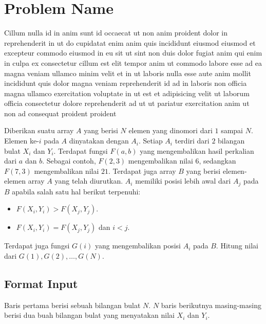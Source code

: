 \section*{
    \centering
    Problem Name
}

\par Cillum nulla id in anim sunt id occaecat ut non anim proident dolor in reprehenderit in ut do cupidatat enim anim quis incididunt eiusmod eiusmod et excepteur commodo eiusmod in eu sit ut sint non duis dolor fugiat anim qui enim in culpa ex consectetur cillum est elit tempor anim ut commodo labore esse ad ea magna veniam ullamco minim velit et in ut laboris nulla esse aute anim mollit incididunt quis dolor magna veniam reprehenderit id ad in laboris non officia magna ullamco exercitation voluptate in ut est et adipisicing velit ut laborum officia consectetur dolore reprehenderit ad ut ut pariatur exercitation anim ut non ad consequat proident proident
\newline

\par Diberikan suatu array $A$ yang berisi $N$ elemen yang dinomori dari $1$ sampai $N$. Elemen ke-$i$ pada $A$ dinyatakan dengan $A_i$. Setiap $A_i$ terdiri dari $2$ bilangan bulat $X_i$ dan $Y_i$. Terdapat fungsi $F(a,b)$ yang mengembalikan hasil perkalian dari $a$ dan $b$. Sebagai contoh, $F(2,3)$ mengembalikan nilai $6$, sedangkan $F(7,3)$ mengembalikan nilai $21$. Terdapat juga array $B$ yang berisi elemen-elemen array $A$ yang telah diurutkan. $A_i$ memiliki posisi lebih awal dari $A_j$ pada $B$ apabila salah satu hal berikut terpenuhi:

\begin{itemize}
    \item $F(X_i,Y_i) > F(X_j, Y_j)$.
    \item $F(X_i,Y_i) = F(X_j, Y_j)$ dan $i < j$.
\end{itemize}

\par Terdapat juga fungsi $G(i)$ yang mengembalikan posisi $A_i$ pada $B$. Hitung nilai dari $G(1), G(2), \dots , G(N)$.




\subsection*{Format Input}

\par\noindent Baris pertama berisi sebuah bilangan bulat $N$. $N$ baris berikutnya masing-masing berisi dua buah bilangan bulat yang menyatakan nilai $X_i$ dan $Y_i$.




